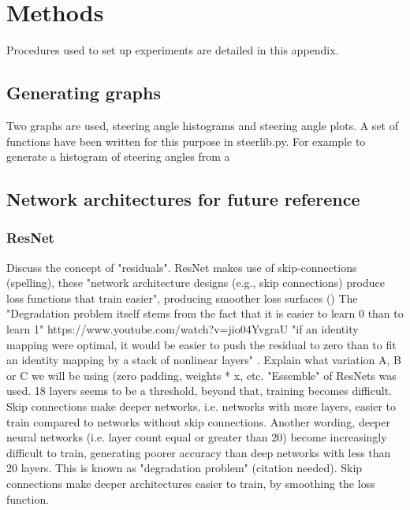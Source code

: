\chapter{Methods} %
\label{AppendixA-methods} 

Procedures used to set up experiments are detailed in this appendix.

\section{Generating graphs}

Two graphs are used, steering angle histograms and steering angle plots. A set of functions have been written for this purpose in steerlib.py. For example to generate a histogram of steering angles from a 

\section{Network architectures for future reference}

\subsection{ResNet}

Discuss the concept of "residuals". ResNet makes use of skip-connections (spelling), these "network architecture
designs (e.g., skip connections) produce loss functions that train easier", producing smoother loss surfaces (\cite{li2017visualizing})  
The "Degradation problem itself stems from the fact that it is easier to learn 0 than to learn 1"   https://www.youtube.com/watch?v=jio04YvgraU
"if an identity mapping were optimal, it would be easier to push the residual to zero than to fit an identity mapping by a stack of nonlinear layers" \cite{he2015deep}.  
Explain what variation A, B or C we will be using (zero padding, weights * x, etc.  
"Essemble" of ResNets was used.  
18 layers seems to be a threshold, beyond that, training becomes difficult. Skip connections make deeper networks, i.e. networks with more layers, easier to train compared to networks without skip connections.  
Another wording, deeper neural networks (i.e. layer count equal or greater than 20) become increasingly difficult to train, generating poorer accuracy than deep networks with less than 20 layers. This is known as "degradation problem" (citation needed). Skip connections make deeper architectures easier to train, by smoothing the loss function.

